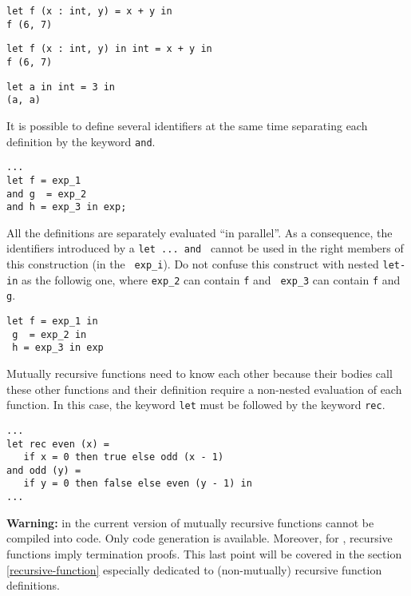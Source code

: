 {\scriptsize
\begin{lstlisting}
let f (x : int, y) = x + y in
f (6, 7)
\end{lstlisting}
}
{\scriptsize
\begin{lstlisting}
let f (x : int, y) in int = x + y in
f (6, 7)
\end{lstlisting}
}
{\scriptsize
\begin{lstlisting}
let a in int = 3 in
(a, a)
\end{lstlisting}
}



\medskip
It is possible to define several identifiers at the same time separating
each definition by the keyword {\tt and}.
{\scriptsize
\begin{lstlisting}
...
let f = exp_1
and g  = exp_2
and h = exp_3 in exp;
\end{lstlisting}
}

All the definitions are separately evaluated ``in parallel''.  As a
consequence, the identifiers introduced by a {\tt let ... and }
cannot be used in the right members of this construction (in the {\tt
  exp\_i}). Do not confuse this construct with nested {\tt let-in} as
the followig one, where {\tt exp\_2} can contain {\tt f} and {\tt
  exp\_3} can contain {\tt f} and {\tt g}.

{\scriptsize
\begin{lstlisting}
let f = exp_1 in
 g  = exp_2 in
 h = exp_3 in exp
\end{lstlisting}
}

Mutually recursive functions need to know each other because their
bodies call these other functions and their definition require a
non-nested evaluation of each function.  In this case, the keyword
{\tt let} must be followed by the keyword {\tt rec}.

{\scriptsize
\begin{lstlisting}
...
let rec even (x) =
   if x = 0 then true else odd (x - 1)
and odd (y) =
   if y = 0 then false else even (y - 1) in
...
\end{lstlisting}
}

{\large {\bf Warning:}} in the current version of {\focal} mutually
recursive functions cannot be compiled into {\coq} code. Only
{\ocaml} code generation is available. Moreover, for \coq, recursive
functions imply termination proofs. This last point will be covered in
the section \ref{recursive-function} especially dedicated to
(non-mutually) recursive function definitions.



